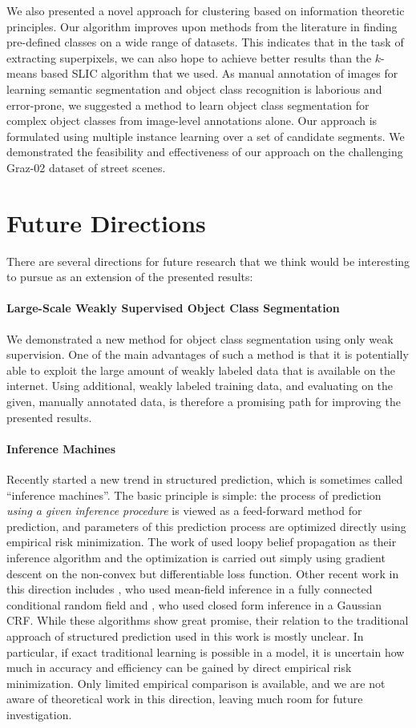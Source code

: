 \documentclass[12pt,toc=bibnumbered, a4paper,twoside,DIV=11,BCOR=1cm]{scrbook}
\begin{document}
We also presented a novel approach for clustering based on information
theoretic principles. Our algorithm improves upon methods from the literature
in finding pre-defined classes on a wide range of datasets. This indicates that
in the task of extracting superpixels, we can also hope to achieve better
results than the $k$-means based SLIC algorithm that we used.
\enlargethispage{1cm}
As manual annotation of images for learning semantic segmentation and object
class recognition is laborious and error-prone, we suggested a method to
learn object class segmentation for complex object classes from image-level
annotations alone. Our approach is formulated using multiple instance learning
over a set of candidate segments. We demonstrated the feasibility and effectiveness
of our approach on the challenging Graz-02 dataset of street scenes.

\section{Future Directions}
There are several directions for future research that we think would be
interesting to pursue as an extension of the presented results:
\paragraph{Large-Scale Weakly Supervised Object Class Segmentation}
We demonstrated a new method for object class segmentation using only weak
supervision. One of the main advantages of such a method is that it is
potentially able to exploit the large amount of weakly labeled data that
is available on the internet. Using additional, weakly labeled training data,
and evaluating on the given, manually annotated data, is therefore a promising
path for improving the presented results.
\paragraph{Inference Machines}
Recently \citet{stoyanov2011empirical} started a new trend in structured
prediction, which is sometimes called ``inference machines''. The basic
principle is simple: the process of prediction \emph{using a given inference
procedure} is viewed as a feed-forward method for prediction, and parameters of this
prediction process are optimized directly using empirical risk minimization. The work of
\citet{stoyanov2011empirical} used loopy belief propagation as their inference
algorithm and the optimization is carried out simply using gradient descent on
the non-convex but differentiable loss function.  Other recent work in this
direction includes \citet{krahenbuhlparameter}, who used mean-field inference
in a fully connected conditional random field and \citet{jancsarylearning}, who
used closed form inference in a Gaussian CRF\@.
While these algorithms show great promise, their relation to the traditional
approach of structured prediction used in this work is mostly unclear. In particular,
if exact traditional learning is possible in a model, it is uncertain how much
in accuracy and efficiency can be gained by direct empirical risk minimization.
Only limited empirical comparison is available, and we are not aware of theoretical
work in this direction, leaving much room for future investigation.
\end{document}
